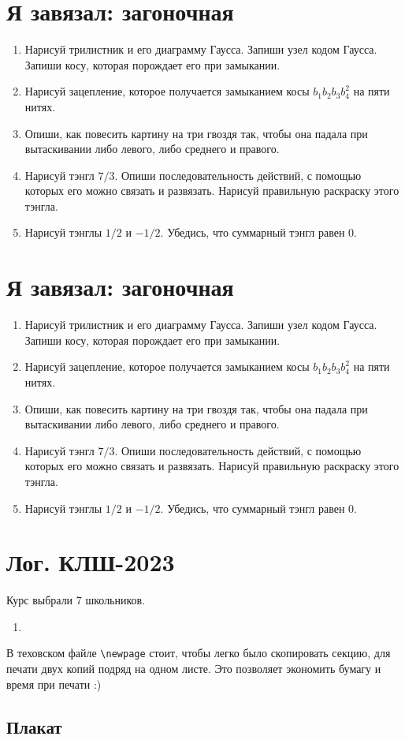 \documentclass[12pt]{article}
\newcounter{problem}[section]
\theoremstyle{definition}
\begin{document}
\newcommand{\dayseven}{
  \section*{Я завязал: загоночная}
  \begin{enumerate}
    \item Нарисуй трилистник и его диаграмму Гаусса. Запиши узел кодом Гаусса. Запиши косу, которая порождает его при замыкании.
    \item Нарисуй зацепление, которое получается замыканием косы $b_1 b_2 b_3 b_4^2$ на пяти нитях.
    \item Опиши, как повесить картину на три гвоздя так, чтобы она падала при вытаскивании либо левого, 
    либо среднего и правого. 
    \item Нарисуй тэнгл $7/3$. Опиши последовательность действий, с помощью которых его можно связать и развязать.
    Нарисуй правильную раскраску этого тэнгла.
    \item Нарисуй тэнглы $1/2$ и $-1/2$. Убедись, что суммарный тэнгл равен 0. 
  \end{enumerate}
}

\dayseven
\vfill
\dayseven
\newpage



\section{Лог. КЛШ-2023}

Курс выбрали 7 школьников.

\begin{enumerate}
  \item 
\end{enumerate}

В теховском файле \verb|\newpage| стоит, чтобы легко было скопировать секцию, для печати двух копий подряд на одном листе.
Это позволяет экономить бумагу и время при печати :)

\subsection{Плакат}






\renewenvironment{solution}[1]{%
         \vskip .5cm plus 2cm minus 0.1cm%
         {\bfseries \hyperlink{problem:#1}{#1.}}%
}%
{%
}%
\end{document}
